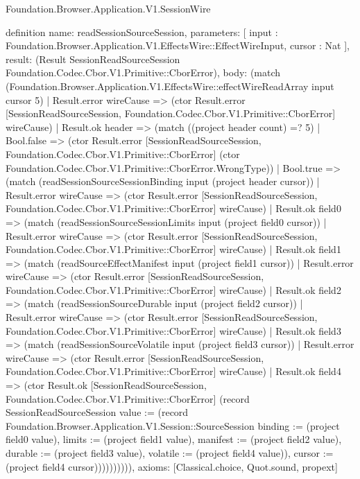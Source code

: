 \begin{lexlean}{Foundation.Browser.Application.V1.SessionWire}
\begin{semanticmodule}
definition{
  name: readSessionSourceSession,
  parameters: [
    input : Foundation.Browser.Application.V1.EffectsWire::EffectWireInput,
    cursor : Nat
  ],
  result: (Result SessionReadSourceSession Foundation.Codec.Cbor.V1.Primitive::CborError),
  body: (match (Foundation.Browser.Application.V1.EffectsWire::effectWireReadArray input cursor 5)
    | Result.error wireCause => (ctor Result.error [SessionReadSourceSession, Foundation.Codec.Cbor.V1.Primitive::CborError] wireCause)
    | Result.ok header => (match ((project header count) =? 5)
      | Bool.false => (ctor Result.error [SessionReadSourceSession, Foundation.Codec.Cbor.V1.Primitive::CborError] (ctor Foundation.Codec.Cbor.V1.Primitive::CborError.WrongType))
      | Bool.true => (match (readSessionSourceSessionBinding input (project header cursor))
        | Result.error wireCause => (ctor Result.error [SessionReadSourceSession, Foundation.Codec.Cbor.V1.Primitive::CborError] wireCause)
        | Result.ok field0 => (match (readSessionSourceSessionLimits input (project field0 cursor))
          | Result.error wireCause => (ctor Result.error [SessionReadSourceSession, Foundation.Codec.Cbor.V1.Primitive::CborError] wireCause)
          | Result.ok field1 => (match (readSourceEffectManifest input (project field1 cursor))
            | Result.error wireCause => (ctor Result.error [SessionReadSourceSession, Foundation.Codec.Cbor.V1.Primitive::CborError] wireCause)
            | Result.ok field2 => (match (readSessionSourceDurable input (project field2 cursor))
              | Result.error wireCause => (ctor Result.error [SessionReadSourceSession, Foundation.Codec.Cbor.V1.Primitive::CborError] wireCause)
              | Result.ok field3 => (match (readSessionSourceVolatile input (project field3 cursor))
                | Result.error wireCause => (ctor Result.error [SessionReadSourceSession, Foundation.Codec.Cbor.V1.Primitive::CborError] wireCause)
                | Result.ok field4 => (ctor Result.ok [SessionReadSourceSession, Foundation.Codec.Cbor.V1.Primitive::CborError] (record SessionReadSourceSession {value := (record Foundation.Browser.Application.V1.Session::SourceSession {binding := (project field0 value), limits := (project field1 value), manifest := (project field2 value), durable := (project field3 value), volatile := (project field4 value)}), cursor := (project field4 cursor)}))))))))),
  axioms: [Classical.choice, Quot.sound, propext]
}


\end{semanticmodule}
\end{lexlean}
